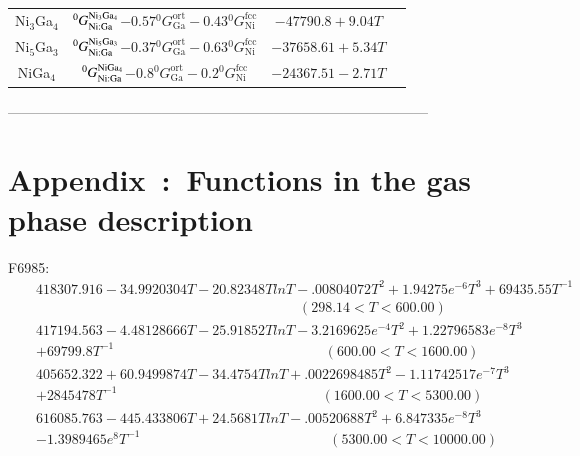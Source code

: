 \documentclass[article]{elsarticle}
\begin{document}
\begin{longtable}{| c | c | c |c|}
 Ni$_{3}$Ga$_{4}$& $^{0}G_{\text{Ni:Ga}}^{\text{Ni\ensuremath{_{\text{3}}}Ga\ensuremath{_{\text{4}}}}}$$-0.57{}^{\text{0}}G_{\text{Ga}}^{\text{ort}}-0.43{}^{\text{0}}G_{\text{Ni}}^{\text{fcc}}$ & $-47790.8+9.04T$ & \cite{Ipser04} \tabularnewline 
 Ni$_{5}$Ga$_{3}$& $^{0}G_{\text{Ni:Ga}}^{\text{Ni\ensuremath{_{\text{5}}}Ga\ensuremath{_{\text{3}}}}}$$-0.37{}^{\text{0}}G_{\text{Ga}}^{\text{ort}}-0.63{}^{\text{0}}G_{\text{Ni}}^{\text{fcc}}$ & $-37658.61+5.34T$ & \cite{Ipser04} \tabularnewline 
 NiGa$_{4}$& $^{0}G_{\text{Ni:Ga}}^{\text{NiGa\ensuremath{_{\text{4}}}}}$$-0.8{}^{\text{0}}G_{\text{Ga}}^{\text{ort}}-0.2{}^{\text{0}}G_{\text{Ni}}^{\text{fcc}}$ & $-24367.51-2.71T$ & \cite{Ipser04} \tabularnewline
\hline
\end{longtable}
------------------------------------------------------------------------------------------%
\pagebreak
\newpage
\appendix
\section{Appendix~:~Functions in the gas phase description}
\label{app}
F6985:
\begin{eqnarray}
&&418307.916-34.9920304T-20.82348Tln{T}-.00804072T^2+1.94275e^{-6}T^3+69435.55T^{-1}\nonumber\\&&    ~~~~~~~~~~~~~~~~~~~~~~~~~~~~~~~~~~~~~~~~~~~~~~~~~~~~~~~~~~~~~~~~~~~~~~~~~~~~~~~~~~~~~(298.14<T<600.00)\nonumber\\
&&417194.563-4.48128666T-25.91852Tln{T}-3.2169625e^{-4}T^2+1.22796583e^{-8}T^3\nonumber
~~~~~~~\\&&+69799.8T^{-1}\nonumber~~~~~~~~~~~~~~~~~~~~~~~~~~~~~~~~~~~~~~~~~~~~~~~~~~~~~~~~~~~~~~~~~~~~(600.00<T<1600.00)\nonumber\\
&&405652.322+60.9499874T-34.4754Tln{T}+.0022698485T^2-1.11742517e^{-7}T^3\nonumber
~~~~~~~\\&&+2845478T^{-1}\nonumber~~~~~~~~~~~~~~~~~~~~~~~~~~~~~~~~~~~~~~~~~~~~~~~~~~~~~~~~~~~~~~~~~~(1600.00<T<5300.00)\nonumber\\
&&616085.763-445.433806T+24.5681Tln{T}-.00520688T^2+6.847335e^{-8}T^3\nonumber
~~~~~~~\\&&-1.3989465e^{8}T^{-1}\nonumber~~~~~~~~~~~~~~~~~~~~~~~~~~~~~~~~~~~~~~~~~~~~~~~~~~~~~~~~~~~~~(5300.00<T<10000.00)\nonumber
\end{eqnarray}
\end{document}
